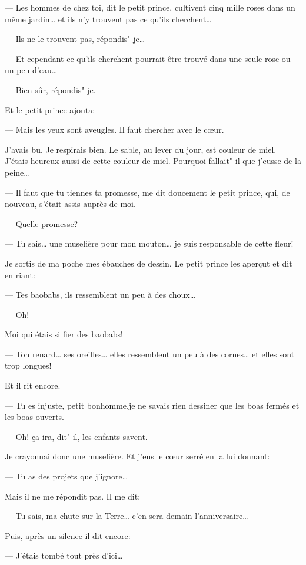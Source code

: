 \begin{Parallel}[p]{}{}
{--- Les hommes de chez toi, dit le petit prince, cultivent cinq mille roses dans un
même jardin\ldots{} et ils n'y trouvent pas ce qu'ils cherchent\ldots{}

--- Ils ne le trouvent pas, répondis"-je\ldots{}

--- Et cependant ce qu'ils cherchent pourrait être trouvé dans une seule rose ou un
peu d'eau\ldots{}

--- Bien sûr, répondis"-je.

Et le petit prince ajouta:

--- Mais les yeux sont aveugles. Il faut chercher avec le cœur.

\medskip

J'avais bu. Je respirais bien. Le sable, au lever du jour, est couleur de miel.
J'étais heureux aussi de cette couleur de miel. Pourquoi fallait"-il que j'eusse
de la peine\ldots{}

--- Il faut que tu tiennes ta promesse, me dit doucement le petit prince, qui, de
nouveau, s'était assis auprès de moi.

--- Quelle promesse?

--- Tu sais\ldots{} une muselière pour mon mouton\ldots{} je suis responsable de
cette fleur!

Je sortis de ma poche mes ébauches de dessin. Le petit prince les aperçut et dit
en riant:

--- Tes baobabs, ils ressemblent un peu à des choux\ldots{}

--- Oh!

Moi qui étais si fier des baobabs!

--- Ton renard\ldots{} ses oreilles\ldots{} elles ressemblent un peu à des cornes\ldots{}
et elles sont trop longues!

Et il rit encore.

--- Tu es injuste, petit bonhomme,je ne savais rien dessiner que les boas fermés
et les boas ouverts.

--- Oh! ça ira, dit"-il, les enfants savent.

Je crayonnai donc une muselière. Et j'eus le cœur serré en la lui donnant:

--- Tu as des projets que j'ignore\ldots{}

Mais il ne me répondit pas. Il me dit:

--- Tu sais, ma chute sur la Terre\ldots{} c'en sera demain l'anniversaire\ldots{}

Puis, après un silence il dit encore:

--- J'étais tombé tout près d'ici\ldots{}

}
\end{Parallel}
